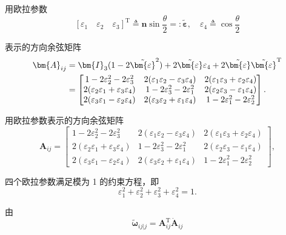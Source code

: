 用欧拉参数
\begin{equation}
    \left[\varepsilon_1\quad \varepsilon_2\quad \varepsilon_3\right]^{\mathrm{T}} \triangleq \bm{n}\sin\frac{\theta}{2} =: \tilde{\bm{\varepsilon}},\quad \varepsilon_4 \triangleq \cos\frac{\theta}{2}
\end{equation}

表示的方向余弦矩阵
\begin{align}
    \bm{A}_{ij} &= \bm{I}_3(1-2\tilde{\bm{\varepsilon}}^2) + 2\tilde{\bm{\varepsilon}}\varepsilon_4 + 2\tilde{\bm{\varepsilon}}\tilde{\bm{\varepsilon}}^{\mathrm{T}} \notag\\
    &= \begin{bmatrix}
        1-2\varepsilon_2^2-2\varepsilon_3^2 & 2(\varepsilon_1\varepsilon_2-\varepsilon_3\varepsilon_4) & 2(\varepsilon_1\varepsilon_3+\varepsilon_2\varepsilon_4)\\
        2(\varepsilon_2\varepsilon_1+\varepsilon_3\varepsilon_4) & 1-2\varepsilon_3^2-2\varepsilon_1^2 & 2(\varepsilon_2\varepsilon_3-\varepsilon_1\varepsilon_4)\\
        2(\varepsilon_3\varepsilon_1-\varepsilon_2\varepsilon_4) & 2(\varepsilon_3\varepsilon_2+\varepsilon_1\varepsilon_4) & 1-2\varepsilon_1^2-2\varepsilon_2^2
    \end{bmatrix}.
\end{align}

用欧拉参数表示的方向余弦矩阵
\begin{equation}
    \bm{A}_{ij} = \begin{bmatrix}
        1-2\varepsilon_2^2-2\varepsilon_3^2 & 2(\varepsilon_1\varepsilon_2-\varepsilon_3\varepsilon_4) & 2(\varepsilon_1\varepsilon_3+\varepsilon_2\varepsilon_4)\\
        2(\varepsilon_2\varepsilon_1+\varepsilon_3\varepsilon_4) & 1-2\varepsilon_3^2-2\varepsilon_1^2 & 2(\varepsilon_2\varepsilon_3-\varepsilon_1\varepsilon_4)\\
        2(\varepsilon_3\varepsilon_1-\varepsilon_2\varepsilon_4) & 2(\varepsilon_3\varepsilon_2+\varepsilon_1\varepsilon_4) & 1-2\varepsilon_1^2-2\varepsilon_2^2
    \end{bmatrix},
\end{equation}

四个欧拉参数满足模为 1 的约束方程，即
\begin{equation}
    \varepsilon_1^2 + \varepsilon_2^2 + \varepsilon_3^2 + \varepsilon_4^2 = 1.
\end{equation}

由
\begin{equation}
    \tilde{\bm{\omega}}_{ij|j} = \bm{A}_{ij}^{\mathrm{T}}\dot{\bm{A}}_{ij}
\end{equation}

